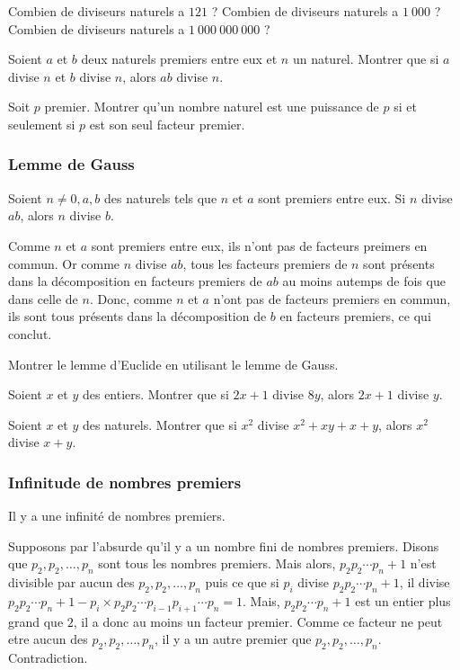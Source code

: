 \exo
Combien de diviseurs naturels a \(121\) ?
Combien de diviseurs naturels a \(1\ 000\) ?
Combien de diviseurs naturels a \(1\ 000\ 000\ 000\) ?

\exo
Soient \(a\) et \(b\) deux naturels premiers entre eux et \(n\) un naturel. Montrer que si \(a\) divise \(n\) et \(b\) divise \(n\), alors \(ab\) divise \(n\).

\exo
Soit \(p\) premier. Montrer qu'un nombre naturel est une puissance de \(p\) si et seulement si \(p\) est son seul facteur premier.

\subsubsection{Lemme de Gauss}

Soient \(n \not= 0, a, b\) des naturels tels que \(n\) et \(a\) sont premiers entre eux. Si \(n\) divise \(ab\), alors \(n\) divise \(b\).

\endgroup

\preuve

Comme \(n\) et \(a\) sont premiers entre eux, ils n'ont pas de facteurs preimers en commun. Or comme \(n\) divise \(ab\), tous les facteurs premiers de \(n\) sont présents dans la décomposition en facteurs premiers de \(ab\) au moins autemps de fois que dans celle de \(n\). Donc, comme \(n\) et \(a\) n'ont pas de facteurs premiers en commun, ils sont tous présents dans la décomposition de \(b\) en facteurs premiers, ce qui conclut.

\exo
Montrer le lemme d'Euclide en utilisant le lemme de Gauss.

\exo
Soient \(x\) et \(y\) des entiers. Montrer que si \(2x+1\) divise \(8y\), alors \(2x+1\) divise \(y\).

\exo
Soient \(x\) et \(y\) des naturels. Montrer que si \(x^2\) divise \(x^2 + xy + x + y\), alors \(x^2\) divise \(x+y\).

\subsubsection{Infinitude de nombres premiers}
\thm

Il y a une infinité de nombres premiers.

\endgroup

\preuve

Supposons par l'absurde qu'il y a un nombre fini de nombres premiers. Disons que \(p_2 , p_2 , \ldots , p_{n}\) sont tous les nombres premiers. Mais alors, \(p_2 p_2 \cdots p_{n} + 1\) n'est divisible par aucun des \(p_2 , p_2 , \ldots , p_{n}\) puis ce que si \(p_{i}\) divise \(p_2 p_2 \cdots p_{n} + 1\), il divise \(p_2 p_2 \cdots p_{n} + 1 - p_{i} \times p_2 p_2 \cdots p_{i-1} p_{i+1} \cdots p_{n} = 1\). Mais, \(p_2 p_2 \cdots p_{n} + 1\) est un entier plus grand que \(2\), il a donc au moins un facteur premier. Comme ce facteur ne peut etre aucun des \(p_2 , p_2 , \ldots , p_{n}\), il y a un autre premier que \(p_2 , p_2 , \ldots , p_{n}\). Contradiction.

